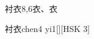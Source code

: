 \begin{entry}{衬衣}{8,6}{⾐、⾐}
  \begin{phonetics}{衬衣}{chen4 yi1}[][HSK 3]
  \end{phonetics}
\end{entry}

